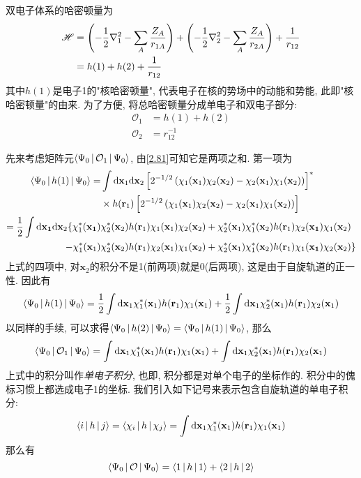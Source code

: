 双电子体系的哈密顿量为
\begin{align}
\mathscr{H}&=\left( -\frac{1}{2}\nabla_1^2 - \sum_A\frac{Z_A}{r_{1A}} \right) + \left( -\frac{1}{2}\nabla_2^2 - \sum_A\frac{Z_A}{r_{2A}} \right) + \frac{1}{r_{12}}\notag\\
&=h(1) + h(2) + \frac{1}{r_{12}}
\end{align}
其中$h(1)$是电子1的"核哈密顿量", 代表电子在核的势场中的动能和势能, 此即"核哈密顿量"的由来. 为了方便, 将总哈密顿量分成单电子和双电子部分:
\begin{align}
\mathcal{O}_1&=h(1)+h(2)\\
\mathcal{O}_2&=r_{12}^{-1}
\end{align}

先来考虑矩阵元$\Braket{\Psi_0|\mathcal{O}_1|\Psi_0}$, 由\ref{2.81}可知它是两项之和. 第一项为
\begin{align}
\braket{\Psi_0|h(1)|\Psi_0}=&\int\db{x}_1\db{x}_2\left[2^{-1/2}\left(\chi_1(\mathbf{x}_1)\chi_2(\mathbf{x}_2)-\chi_2(\mathbf{x}_1)\chi_1(\mathbf{x}_2)\right)\right]^*\notag\\
\qquad&\times h(\mathbf{r}_1)\left[ 2^{-1/2}\left(\chi_1(\mathbf{x}_1)\chi_2(\mathbf{x}_2)-\chi_2(\mathbf{x}_1)\chi_1(\mathbf{x}_2)\right)\right]\notag\\
=\frac{1}{2}\int\dd{\mathbf{x}_1}\dd\mathbf{x}_2\{\chi_1^*(\mathbf{x_1})&\chi_2^*(\mathbf{x}_2)h(\mathbf{r}_1)\chi_1(\mathbf{x}_1)\chi_2(\mathbf{x}_2) + \chi_2^*(\mathbf{x}_1)\chi_1^*(\mathbf{x}_2)h(\mathbf{r}_1)\chi_2(\mathbf{x_1})\chi_1(\mathbf{x}_2) \notag\\
 - \chi_1^*(\mathbf{x}_1)&\chi_2^*(\mathbf{x}_2)h(\mathbf{r}_1)\chi_2(\mathbf{x}_1)\chi_1(\mathbf{x}_2) + \chi_2^*(\mathbf{x}_1)\chi_1^*(\mathbf{x}_2)h(\mathbf{r}_1)\chi_1(\mathbf{x_1})\chi_2(\mathbf{x}_2)
\}
\end{align}
上式的四项中, 对$\mathbf{x}_2$的积分不是1(前两项)就是0(后两项), 这是由于自旋轨道的正一性. 因此有
\begin{equation}
\braket{\Psi_0|h(1)|\Psi_0}=\frac{1}{2}\int\dd\mathbf{x}_1\chi_1^*(\mathbf{x}_1)h(\mathbf{r}_1)\chi_1(\mathbf{x}_1)+\frac{1}{2}\int\dd\mathbf{x}_1\chi_2^*(\mathbf{x}_1)h(\mathbf{r}_1)\chi_2(\mathbf{x}_1)
\end{equation}
以同样的手续, 可以求得$\Braket{\Psi_0|h(2)|\Psi_0}=\Braket{\Psi_0|h(1)|\Psi_0}$, 那么
\begin{equation}
\braket{\Psi_0|\mathcal{O}_1|\Psi_0}=\int\dd\mathbf{x}_1\chi_1^*(\mathbf{x}_1)h(\mathbf{r}_1)\chi_1(\mathbf{x}_1) + \int\dd\mathbf{x}_1\chi_2^*(\mathbf{x}_1)h(\mathbf{r}_1)\chi_2(\mathbf{x}_1)
\end{equation}
上式中的积分叫作\emph{单电子积分}, 也即, 积分都是对单个电子的坐标作的. 积分中的傀标习惯上都选成电子1的坐标. 我们引入如下记号来表示包含自旋轨道的单电子积分:
\begin{equation}
\braket{i|h|j}=\braket{\chi_i|h|\chi_j}=\int\dd\mathbf{x}_1\chi_1^*(\mathbf{x}_1)h(\mathbf{r}_1)\chi_1(\mathbf{x}_1)
\end{equation}
那么有
\begin{equation}
\Braket{\Psi_0|\mathcal{O}|\Psi_0}=\Braket{1|h|1}+\Braket{2|h|2}
\end{equation}

